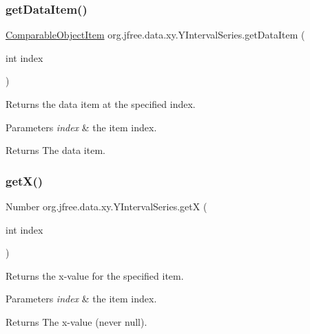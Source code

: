\subsubsection{\texorpdfstring{get\+Data\+Item()}{getDataItem()}}
{\footnotesize\ttfamily \mbox{\hyperlink{classorg_1_1jfree_1_1data_1_1_comparable_object_item}{Comparable\+Object\+Item}} org.\+jfree.\+data.\+xy.\+Y\+Interval\+Series.\+get\+Data\+Item (\begin{DoxyParamCaption}\item[{int}]{index }\end{DoxyParamCaption})}

Returns the data item at the specified index.


\begin{DoxyParams}{Parameters}
{\em index} & the item index.\\
\hline
\end{DoxyParams}
\begin{DoxyReturn}{Returns}
The data item. 
\end{DoxyReturn}
\mbox{\label{classorg_1_1jfree_1_1data_1_1xy_1_1_y_interval_series_ab999562afef626087c19a8751bc047e0}} 
\subsubsection{\texorpdfstring{get\+X()}{getX()}}
{\footnotesize\ttfamily Number org.\+jfree.\+data.\+xy.\+Y\+Interval\+Series.\+getX (\begin{DoxyParamCaption}\item[{int}]{index }\end{DoxyParamCaption})}

Returns the x-\/value for the specified item.


\begin{DoxyParams}{Parameters}
{\em index} & the item index.\\
\hline
\end{DoxyParams}
\begin{DoxyReturn}{Returns}
The x-\/value (never {\ttfamily null}). 
\end{DoxyReturn}
\mbox{\label{classorg_1_1jfree_1_1data_1_1xy_1_1_y_interval_series_a9523b2dc9b01f9bcecc264cf5926f5b9}} 
